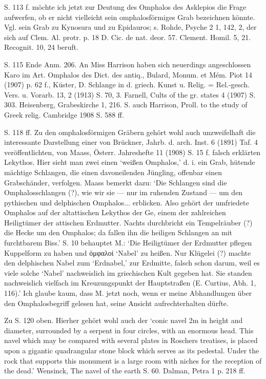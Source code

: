 \documentclass[a4paper, 11pt, oneside]{article}
\begin{document}
S. 113 f. möchte ich jetzt zur Deutung des Omphalos des Asklepios die Frage aufwerfen, ob er nicht vielleicht sein omphalosförmiges Grab bezeichnen könnte. Vgl. sein Grab zu Kynosura und zu Epidauros; s. Rohde, Psyche 2 1, 142, 2, der sich auf Clem. Al. protr. p. 18 D. Cic. de nat. deor. 57. Clement. Homil. 5, 21. Recognit. 10, 24 beruft.

S. 115 Ende Anm. 206. An Miss Harrison haben sich neuerdings angeschlossen Karo im Art. Omphalos des Dict. des antiq., Bulard, Monum. et Mém. Piot 14 (1907) p. 62 f., Küster, D. Schlange in d. griech. Kunst u. Relig. = Rel.-gesch. Vers. u. Vorarb. 13, 2 (1913) S. 70, 3. Farnell, Cults of the gr. states 4 (1907) S. 303. Heisenberg, Grabeskirche 1, 216. S. auch Harrison, Proll. to the study of Greek relig. Cambridge 1908 S. 588 ff.

S. 118 ff. Zu den omphalosförmigen Gräbern gehört wohl auch unzweifelhaft die interessante Darstellung einer von Brückner, Jahrb. d. arch. Inst. 6 (1891) Taf. 4 veröffentlichten, von Maass, Österr. Jahreshefte 11 (1908) S. 15 f. falsch erklärten Lekythos. Hier sieht man zwei einen `weißen Omphalos,' d. i. ein Grab, hütende mächtige Schlangen, die einen davoneilenden Jüngling, offenbar einen Grabschänder, verfolgen. Maass bemerkt dazu: `Die Schlangen sind die Omphalosschlangen (?), wie wir sie --- nur im ruhenden Zustand --- um den pythischen und delphischen Omphalos... erblicken. Also gehört der umfriedete Omphalos auf der altattischen Lekythos der Ge, einem der zahlreichen Heiligtümer der attischen Erdmutter. Nachts durchbricht ein Tempelräuber (?) die Hecke um den Omphalos; da fallen ihn die heiligen Schlangen an mit furchtbarem Biss.' S. 10 behauptet M.: `Die Heiligtümer der Erdmutter pflegen Kuppelform zu haben und ὀμφαλοί `Nabel' zu heißen. Nur Klügelei (?) machte den delphischen Nabel zum `Erdnabel,' zur Erdmitte, falsch schon darum, weil es viele solche `Nabel' nachweislich im griechischen Kult gegeben hat. Sie standen nachweislich vielfach im Kreuzungspunkt der Hauptstraßen (E. Curtius, Abh. 1, 116).' Ich glaube kaum, dass M. jetzt noch, wenn er meine Abhandlungen über den Omphalosbegriff gelesen hat, seine Ansicht aufrechterhalten dürfte.

Zu S. 120 oben. Hierher gehört wohl auch der `conic navel 2m in height and diameter, surrounded by a serpent in four circles, with an enormous head. This navel which may be compared with several plates in Roschers treatises, is placed upon a gigantic quadrangular stone block which serves as its pedestal. Under the rock that supports this monument is a large room with niches for the reception of the dead.' Wensinck, The navel of the earth S. 60. Dalman, Petra 1 p. 218 ff.
\end{document}
